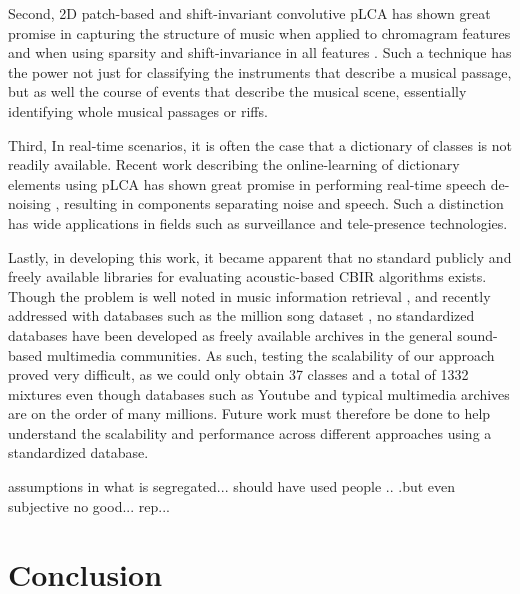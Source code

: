 \documentclass[a4paper,10pt,final]{ThesisStyle}
\begin{document}
Second, 2D patch-based and shift-invariant convolutive pLCA \cite{Smaragdis2007} has shown great promise in capturing the structure of music when applied to chromagram features and when using sparsity and shift-invariance in all features \cite{Weiss2011}.  Such a technique has the power not just for classifying the instruments that describe a musical passage, but as well the course of events that describe the musical scene, essentially identifying whole musical passages or riffs.  

Third, In real-time scenarios, it is often the case that a dictionary of classes is not readily available.  Recent work describing the online-learning of dictionary elements using pLCA has shown great promise in performing real-time speech de-noising \cite{Duan2012}, resulting in components separating noise and speech.  Such a distinction has wide applications in fields such as surveillance and tele-presence technologies.  

Lastly, in developing this work, it became apparent that no standard publicly and freely available libraries for evaluating acoustic-based CBIR algorithms exists.  Though the problem is well noted in music information retrieval \cite{Casey2008b,Rhodes2010}, and recently addressed with databases such as the million song dataset \cite{Bertin-Mahieux2011}, no standardized databases have been developed as freely available archives in the general sound-based multimedia communities.  As such, testing the scalability of our approach proved very difficult, as we could only obtain 37 classes and a total of 1332 mixtures even though databases such as Youtube and typical multimedia archives are on the order of many millions.  Future work must therefore be done to help understand the scalability and performance across different approaches using a standardized database.  

assumptions in what is segregated... should have used people .. .but even subjective no good... rep...


\section{Conclusion}


\end{document}
